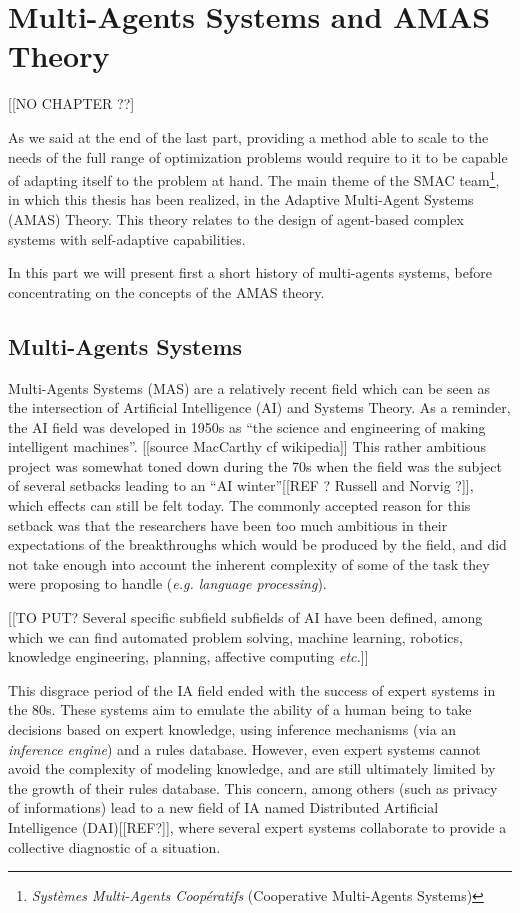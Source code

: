 \chapter{Multi-Agents Systems and AMAS Theory}

[[NO CHAPTER ??]

As we said at the end of the last part, providing a method able to scale to the needs of the full range of optimization problems would require to it to be capable of adapting itself to the problem at hand.
The main theme of the SMAC team\footnote{\emph{Systèmes Multi-Agents Coopératifs} (Cooperative Multi-Agents Systems)}, in which this thesis has been realized, in the Adaptive Multi-Agent Systems (AMAS) Theory. This theory relates to the design of agent-based complex systems with self-adaptive capabilities.

In this part we will present first a short history of multi-agents systems, before concentrating on the concepts of the AMAS theory.

\section{Multi-Agents Systems}

Multi-Agents Systems (MAS) are a relatively recent field which can be seen as the intersection of Artificial Intelligence (AI) and Systems Theory. As a reminder, the AI field was developed in 1950s as \enquote{the science and engineering of making intelligent machines}. [[source MacCarthy cf wikipedia]] This rather ambitious project was somewhat toned down during the 70s when the field was the subject of several setbacks leading to an \enquote{AI winter}[[REF ? Russell and Norvig ?]], which effects can still be felt today. The commonly accepted reason for this setback was that the researchers have been too much ambitious in their expectations of the breakthroughs which would be produced by the field, and did not take enough into account the inherent complexity of some of the task they were proposing to handle (\emph{e.g. language processing}).

[[TO PUT? Several specific subfield subfields of AI have been defined, among which we can find automated problem solving, machine learning, robotics, knowledge engineering, planning, affective computing \emph{etc.}]]

This disgrace period of the IA field ended with the success of expert systems in the 80s. These systems aim to emulate the ability of a human being to take decisions based on expert knowledge, using inference mechanisms (via an \emph{inference engine}) and a rules database.
However, even expert systems cannot avoid the complexity of modeling knowledge, and are still ultimately limited by the growth of their rules database. This concern, among others (such as privacy of informations) lead to a new field of IA named Distributed Artificial Intelligence (DAI)[[REF?]], where several expert systems collaborate to provide a collective diagnostic of a situation.


